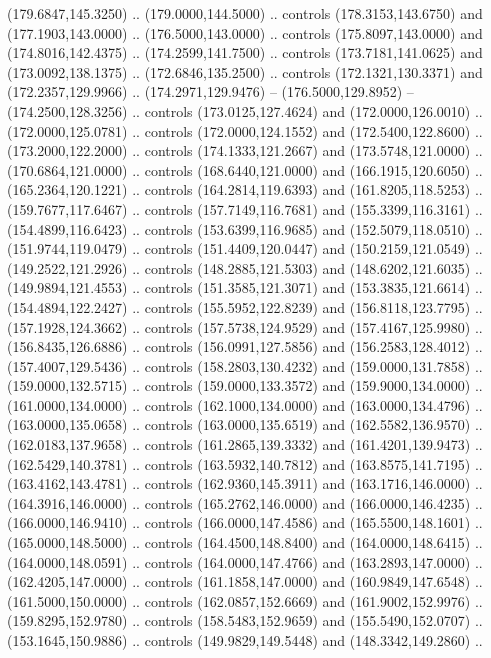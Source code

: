   (179.6847,145.3250) .. (179.0000,144.5000) .. controls (178.3153,143.6750) and
  (177.1903,143.0000) .. (176.5000,143.0000) .. controls (175.8097,143.0000) and
  (174.8016,142.4375) .. (174.2599,141.7500) .. controls (173.7181,141.0625) and
  (173.0092,138.1375) .. (172.6846,135.2500) .. controls (172.1321,130.3371) and
  (172.2357,129.9966) .. (174.2971,129.9476) -- (176.5000,129.8952) --
  (174.2500,128.3256) .. controls (173.0125,127.4624) and (172.0000,126.0010) ..
  (172.0000,125.0781) .. controls (172.0000,124.1552) and (172.5400,122.8600) ..
  (173.2000,122.2000) .. controls (174.1333,121.2667) and (173.5748,121.0000) ..
  (170.6864,121.0000) .. controls (168.6440,121.0000) and (166.1915,120.6050) ..
  (165.2364,120.1221) .. controls (164.2814,119.6393) and (161.8205,118.5253) ..
  (159.7677,117.6467) .. controls (157.7149,116.7681) and (155.3399,116.3161) ..
  (154.4899,116.6423) .. controls (153.6399,116.9685) and (152.5079,118.0510) ..
  (151.9744,119.0479) .. controls (151.4409,120.0447) and (150.2159,121.0549) ..
  (149.2522,121.2926) .. controls (148.2885,121.5303) and (148.6202,121.6035) ..
  (149.9894,121.4553) .. controls (151.3585,121.3071) and (153.3835,121.6614) ..
  (154.4894,122.2427) .. controls (155.5952,122.8239) and (156.8118,123.7795) ..
  (157.1928,124.3662) .. controls (157.5738,124.9529) and (157.4167,125.9980) ..
  (156.8435,126.6886) .. controls (156.0991,127.5856) and (156.2583,128.4012) ..
  (157.4007,129.5436) .. controls (158.2803,130.4232) and (159.0000,131.7858) ..
  (159.0000,132.5715) .. controls (159.0000,133.3572) and (159.9000,134.0000) ..
  (161.0000,134.0000) .. controls (162.1000,134.0000) and (163.0000,134.4796) ..
  (163.0000,135.0658) .. controls (163.0000,135.6519) and (162.5582,136.9570) ..
  (162.0183,137.9658) .. controls (161.2865,139.3332) and (161.4201,139.9473) ..
  (162.5429,140.3781) .. controls (163.5932,140.7812) and (163.8575,141.7195) ..
  (163.4162,143.4781) .. controls (162.9360,145.3911) and (163.1716,146.0000) ..
  (164.3916,146.0000) .. controls (165.2762,146.0000) and (166.0000,146.4235) ..
  (166.0000,146.9410) .. controls (166.0000,147.4586) and (165.5500,148.1601) ..
  (165.0000,148.5000) .. controls (164.4500,148.8400) and (164.0000,148.6415) ..
  (164.0000,148.0591) .. controls (164.0000,147.4766) and (163.2893,147.0000) ..
  (162.4205,147.0000) .. controls (161.1858,147.0000) and (160.9849,147.6548) ..
  (161.5000,150.0000) .. controls (162.0857,152.6669) and (161.9002,152.9976) ..
  (159.8295,152.9780) .. controls (158.5483,152.9659) and (155.5490,152.0707) ..
  (153.1645,150.9886) .. controls (149.9829,149.5448) and (148.3342,149.2860) ..
